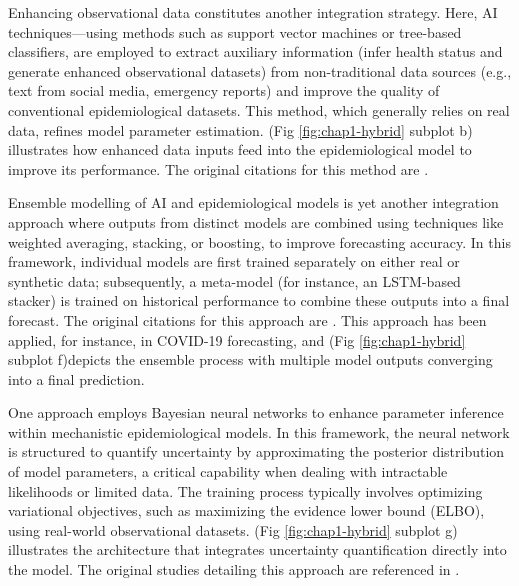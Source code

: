 Enhancing observational data constitutes another integration strategy. Here, AI techniques—using methods such as support vector machines or tree-based classifiers, are employed to extract auxiliary information (infer health status and generate enhanced observational datasets) from non-traditional data sources (e.g., text from social media, emergency reports) and improve the quality of conventional epidemiological datasets. This method, which generally relies on real data, refines model parameter estimation. (Fig \ref{fig:chap1-hybrid} subplot b) illustrates how enhanced data inputs feed into the epidemiological model to improve its performance. The original citations for this method are \cite{tuarob_modeling_2015,solares-hernandez_adaptation_2023,rosato_extracting_2023,kandula_improved_2019}.

Ensemble modelling of AI and epidemiological models is yet another integration approach where outputs from distinct models are combined using techniques like weighted averaging, stacking, or boosting, to improve forecasting accuracy.  In this framework, individual models are first trained separately on either real or synthetic data; subsequently, a meta-model (for instance, an LSTM-based stacker) is trained on historical performance to combine these outputs into a final forecast. The original citations for this approach are \cite{kandula_evaluation_2018,adiga_all_2021,nadler_neural_2020,maniamfu_lstm-based_2023,adiga_enhancing_2022,delli_compagni_hybrid_2022}. This approach has been applied, for instance, in COVID-19 forecasting, and (Fig \ref{fig:chap1-hybrid} subplot f)depicts the ensemble process with multiple model outputs converging into a final prediction.

One approach employs Bayesian neural networks to enhance parameter inference within mechanistic epidemiological models. In this framework, the neural network is structured to quantify uncertainty by approximating the posterior distribution of model parameters, a critical capability when dealing with intractable likelihoods or limited data. The training process typically involves optimizing variational objectives, such as maximizing the evidence lower bound (ELBO), using real-world observational datasets. (Fig \ref{fig:chap1-hybrid} subplot g) illustrates the architecture that integrates uncertainty quantification directly into the model. The original studies detailing this approach are referenced in \cite{ryder2018blackboxvariationalinferencestochastic, ARNST2022108805, 10.1371/journal.pcbi.1005416, 10.1371/journal.pcbi.1009472}.

